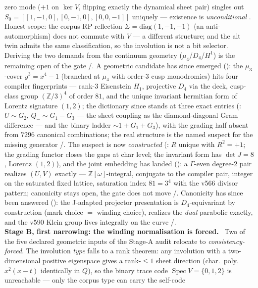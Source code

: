 \documentclass[11pt,a4paper]{article}
\theoremstyle{definition}
\begin{document}
\begin{winbox}
zero mode ($+1$ on $\ker V$, flipping exactly the dynamical sheet
pair) singles out $S_0=[[1,-1,0],[0,-1,0],[0,0,-1]]$ uniquely ---
existence is \emph{unconditional} \mE.  Honest scope: the corpus RP
reflection $\Sigma=\mathrm{diag}(1,-1,-1)$ (an anti-automorphism) does
not commute with $V$ --- a different structure; and the alt twin admits
the same classification, so the involution is not a bit selector.
Deriving the two demands from the continuum geometry
($\mu_4$/$D_4$/$H^1$) is the remaining open of the gate \mE/\mC.
A geometric candidate has since emerged
(): the $\mu_3$-cover $y^3=x^4-1$
(branched at $\mu_4$ with order-3 cusp monodromies) hits four compiler
fingerprints --- rank-3 Eisenstein $H_1$, projective $D_4$ via the
deck, cusp-class group $(\mathbb{Z}/3)^4$ of order $81$, and the
unique invariant hermitian form of Lorentz signature $(1,2)$; the
dictionary since stands at three exact entries
(: $U\sim G_2$, $Q_-\sim G_1-G_3$
--- the sheet coupling as the diamond-diagonal Gram difference ---
and the binary ladder $\sim1+G_1+G_3$), with the grading half absent
from $7296$ canonical combinations; the real structure is the named
suspect for the missing generator \mE/\mC.  The suspect is now
\emph{constructed} (: $R$ unique with
$R^2=+1$; the grading functor closes the gaps at char level; the
invariant form has $\det J=8$, Lorentz $(1,2)$), and the joint
embedding has landed (): a
$\Gamma$-even degree-2 pair realizes $(U,V)$ exactly ---
$\mathbb{Z}[\omega]$-integral, conjugate to the compiler pair,
integer on the saturated fixed lattice, saturation index $81=3^4$
with the v566 divisor pattern; canonicity stays open, the gate does
not move \mE/\mC.  Canonicity has since been answered
(): the J-adapted projector
presentation is $D_4$-equivariant by construction (mark choice $=$
winding choice), realizes the \emph{dual} parabolic exactly, and the
v590 Klein group lives integrally on the curve \mE/\mC.
\smallskip\\
\noindent\textbf{Stage B, first narrowing: the winding normalisation is forced.}
\ Two of the five declared geometric inputs of the Stage-A audit
relocate to \emph{consistency-forced}.  The involution \emph{type} falls to a rank theorem: any
involution with a two-dimensional positive eigenspace gives a rank-$\le1$ sheet direction
(char.\ poly.\ $x^2(x-t)$ identically in $Q$), so the binary trace code
$\operatorname{Spec}V=\{0,1,2\}$ is unreachable --- only the corpus type can carry the self-code

\end{winbox}
\end{document}

